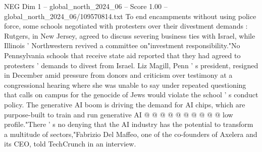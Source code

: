 \begin{textsample}{NEG Dim 1 – global\_north\_2024\_06 – Score 1.00 – global\_north\_2024\_06/109570814.txt}
To end encampments without using police force, some schools negotiated with protesters over their divestment demands : Rutgers, in New Jersey, agreed to discuss severing business ties with Israel, while Illinois ' Northwestern revived a committee on"investment responsibility."No Pennsylvania schools that receive state aid reported that they had agreed to protesters ' demands to divest from Israel.
Liz Magill, Penn ' s president, resigned in December amid pressure from donors and criticism over testimony at a congressional hearing where she was unable to say under repeated questioning that calls on campus for the genocide of Jews would violate the school ' s conduct policy.
The generative AI boom is driving the demand for AI chips, which are purpose-built to train and run generative AI @ @ @ @ @ @ @ @ @ @ low profile."There ' s no denying that the AI industry has the potential to transform a multitude of sectors,"Fabrizio Del Maffeo, one of the co-founders of Axelera and its CEO, told TechCrunch in an interview.

\end{textsample}
